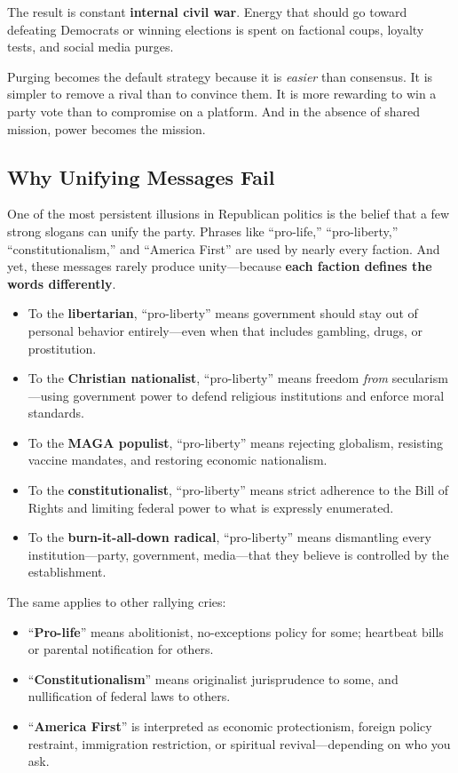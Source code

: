 The result is constant \textbf{internal civil war}. Energy that should go toward defeating Democrats or winning elections is spent on factional coups, loyalty tests, and social media purges.

Purging becomes the default strategy because it is \textit{easier} than consensus. It is simpler to remove a rival than to convince them. It is more rewarding to win a party vote than to compromise on a platform. And in the absence of shared mission, power becomes the mission.

\subsection{Why Unifying Messages Fail}

One of the most persistent illusions in Republican politics is the belief that a few strong slogans can unify the party. Phrases like “pro-life,” “pro-liberty,” “constitutionalism,” and “America First” are used by nearly every faction. And yet, these messages rarely produce unity—because \textbf{each faction defines the words differently}.

\begin{itemize}
\item To the \textbf{libertarian}, “pro-liberty” means government should stay out of personal behavior entirely—even when that includes gambling, drugs, or prostitution.
\item To the \textbf{Christian nationalist}, “pro-liberty” means freedom \textit{from} secularism—using government power to defend religious institutions and enforce moral standards.
\item To the \textbf{MAGA populist}, “pro-liberty” means rejecting globalism, resisting vaccine mandates, and restoring economic nationalism.
\item To the \textbf{constitutionalist}, “pro-liberty” means strict adherence to the Bill of Rights and limiting federal power to what is expressly enumerated.
\item To the \textbf{burn-it-all-down radical}, “pro-liberty” means dismantling every institution—party, government, media—that they believe is controlled by the establishment.
\end{itemize}

The same applies to other rallying cries:

\begin{itemize}
\item “\textbf{Pro-life}” means abolitionist, no-exceptions policy for some; heartbeat bills or parental notification for others.
\item “\textbf{Constitutionalism}” means originalist jurisprudence to some, and nullification of federal laws to others.
\item “\textbf{America First}” is interpreted as economic protectionism, foreign policy restraint, immigration restriction, or spiritual revival—depending on who you ask.
\end{itemize}

